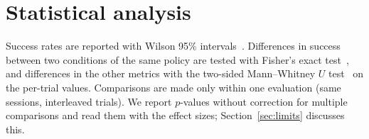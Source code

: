 \section{Statistical analysis}

Success rates are reported with Wilson 95\% intervals~\cite{wilson1927}. Differences in success between two
conditions of the same policy are tested with Fisher's exact test~\cite{fisher1935}, and differences in the other
metrics with the two-sided Mann--Whitney $U$ test~\cite{mann1947} on the per-trial values. Comparisons are made only
within one evaluation (same sessions, interleaved trials). We report $p$-values without correction for multiple
comparisons and read them with the effect sizes; Section~\ref{sec:limits} discusses this.
